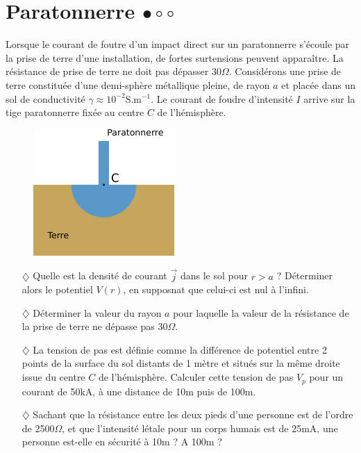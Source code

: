 \documentclass{report}
\begin{document}
\newpage

\section*{Paratonnerre $\bullet\circ\circ$}

Lorsque le courant de foutre d'un impact direct sur un paratonnerre s'écoule par la prise de terre d'une installation, de fortes surtensions peuvent apparaître. La résistance de prise de terre ne doit pas dépasser 30$\Omega$. Considérons une prise de terre constituée d'une demi-sphère métallique pleine, de rayon $a$ et placée dans un sol de conductivité $\gamma\approx10^{-2}$S.m$^{-1}$. Le courant de foudre d'intensité $I$ arrive sur la tige paratonnerre fixée au centre $C$ de l'hémisphère.

\begin{figure}[h!]
\centering
		\includegraphics[scale=1.5]{EM1.pdf}
\end{figure}

\begin{itemize}
	
	\item[$\diamondsuit$] Quelle est la densité de courant $\vec{j}$ dans le sol pour $r>a$ ? Déterminer alors le potentiel $V(r)$, en supposnat que celui-ci est nul à l'infini. 
	
	\item[$\diamondsuit$] Déterminer la valeur du rayon $a$ pour laquelle la valeur de la résistance de la prise de terre ne dépasse pas 30$\Omega$.
	
	\item[$\diamondsuit$] La tension de pas est définie comme la différence de potentiel entre 2 points de la surface du sol distants de 1 mètre et situés sur la même droite issue du centre $C$ de l'hémisphère. Calculer cette tension de pas $V_p$ pour un courant de 50kA, à une distance de 10m puis de 100m.
	
	\item[$\diamondsuit$] Sachant que la résistance entre les deux pieds d'une personne est de l'ordre de 2500$\Omega$, et que l'intensité létale pour un corps humais est de 25mA, une personne est-elle en sécurité à 10m ? A 100m ? 
	
\end{itemize} 
\end{document}
